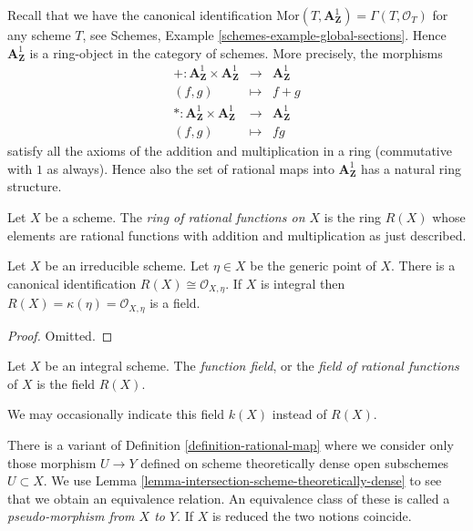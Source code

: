\medskip\noindent
Recall that we have the canonical identification
$\text{Mor}(T, \mathbf{A}^1_{\mathbf{Z}}) = \Gamma(T, \mathcal{O}_T)$
for any scheme $T$, see Schemes, Example \ref{schemes-example-global-sections}.
Hence $\mathbf{A}^1_{\mathbf{Z}}$ is a ring-object in the
category of schemes. More precisely, the morphisms
\begin{eqnarray*}
+ : \mathbf{A}^1_{\mathbf{Z}} \times \mathbf{A}^1_{\mathbf{Z}}
& \longrightarrow &
\mathbf{A}^1_{\mathbf{Z}} \\
(f, g) & \longmapsto & f + g \\
* : \mathbf{A}^1_{\mathbf{Z}} \times \mathbf{A}^1_{\mathbf{Z}}
& \longrightarrow &
\mathbf{A}^1_{\mathbf{Z}} \\
(f, g) & \longmapsto & fg
\end{eqnarray*}
satisfy all the axioms of the addition and multiplication in a ring
(commutative with $1$ as always). Hence also the set of rational
maps into $\mathbf{A}^1_{\mathbf{Z}}$ has a natural ring structure.

\begin{definition}
\label{definition-ring-of-rational-functions}
Let $X$ be a scheme. The {\it ring of rational functions on $X$}
is the ring $R(X)$ whose elements are rational functions with
addition and multiplication as just described.
\end{definition}

\begin{lemma}
\label{lemma-integral-scheme-rational-functions}
Let $X$ be an irreducible scheme. Let $\eta \in X$ be the generic point
of $X$. There is a canonical identification
$R(X) \cong \mathcal{O}_{X, \eta}$. If $X$ is integral then
$R(X) = \kappa(\eta) = \mathcal{O}_{X, \eta}$ is
a field.
\end{lemma}

\begin{proof}
Omitted.
\end{proof}

\begin{definition}
\label{definition-function-field}
Let $X$ be an integral scheme.
The {\it function field}, or the {\it field of rational functions}
of $X$ is the field $R(X)$.
\end{definition}

\noindent
We may occasionally indicate this field $k(X)$ instead of $R(X)$.

\begin{remark}
\label{remark-pseudo-morphisms}
There is a variant of Definition \ref{definition-rational-map}
where we consider only those morphism $U \to Y$ defined on
scheme theoretically dense open subschemes $U \subset X$.
We use Lemma \ref{lemma-intersection-scheme-theoretically-dense}
to see that we obtain an equivalence relation.
An equivalence class of these is called a
{\it pseudo-morphism from $X$ to $Y$}.
If $X$ is reduced the two notions coincide.
\end{remark}

